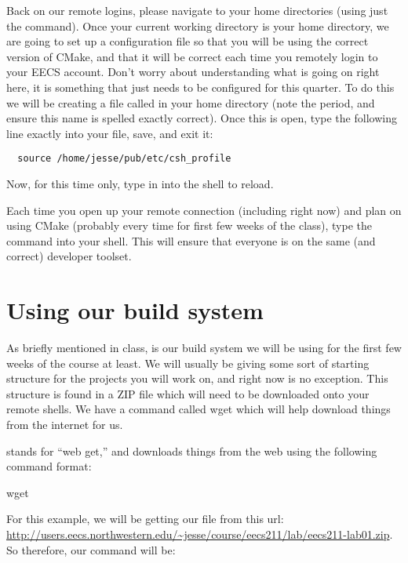 \documentclass{tufte-handout}
\begin{document}
Back on our remote logins, please navigate to your home directories
(using just the  command). Once your current working
directory is your home directory, we are going to set up a configuration
file so that you will be using the correct version of CMake, and that it
will be correct each time you remotely login to your EECS account. Don't
worry about understanding what is going on right here, it is something
that just needs to be configured for this quarter. To do this we will be
creating a file called  in your home directory (note
the period, and ensure this name is spelled exactly
correct). Once this is open, type
the following line exactly into your file, save, and exit it:

\begin{verbatim}
  source /home/jesse/pub/etc/csh_profile
\end{verbatim}

Now, for this time only, type in  into the shell to
reload.

Each time you open up your remote connection (including right now) and
plan on using CMake (probably every time for first few weeks of the
class), type the  command into your shell.  This will
ensure that everyone is on the same (and correct) developer toolset.

\section{Using our build system}

As briefly mentioned in class,  is our build system we
will be using for the first few weeks of the course at least.  We will
usually be giving some sort of starting structure for the projects you
will work on, and right now is no exception.  This structure is found in
a ZIP file which will need to be
downloaded onto your remote shells.  We have a command called wget which
will help download things from the internet for us.

 stands for ``web get,'' and downloads things from the web using the
following command format:

\begin{CmdLine}
  \prompt wget 
\end{CmdLine}

\noindent
For this example, we will be getting our file from this url:
\url{http://users.eecs.northwestern.edu/~jesse/course/eecs211/lab/eecs211-lab01.zip}.
So therefore, our command will be:
\end{document}
